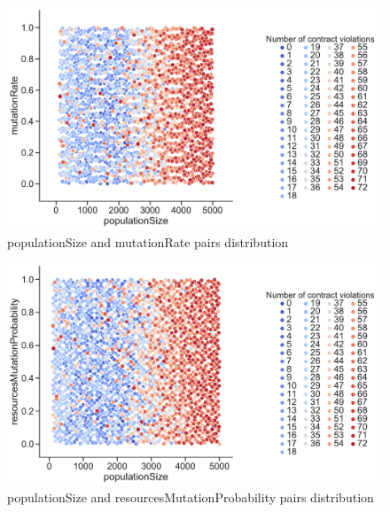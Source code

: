 \begin{figure}
	\centering
	\includegraphics[width=\textwidth]{images/PairsDistr/populationSize_mutationRate.pdf}
	\caption[populationSize and mutationRate pairs distribution]{populationSize and mutationRate pairs distribution}
	\label{fig:populationSize_mutationRate_pair}
\end{figure}
\begin{figure}
	\centering
	\includegraphics[width=\textwidth]{images/PairsDistr/populationSize_resourcesMutationProbability.pdf}
	\caption[populationSize and resourcesMutationProbability pairs distribution]{populationSize and resourcesMutationProbability pairs distribution}
	\label{fig:populationSize_resourcesMutationProbability_pair}
\end{figure}
